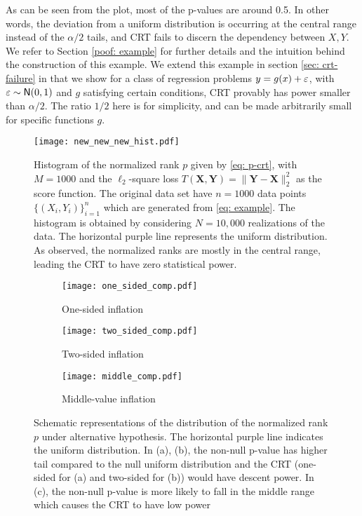 \documentclass[11pt]{article}
\def\bX{\mathbf{X}}
\def\bY{\mathbf{Y}}
\def\normal{\mathsf{N}}
\begin{document}
As can be seen from the plot, most of the p-values are around 0.5. In other words, the deviation from a uniform distribution is occurring at the central range instead of the $\alpha/2$ tails, and CRT fails to discern the dependency between $X,Y$. We refer to Section \ref{poof: example} for further details and the intuition behind the construction of this example. We extend this example in section \ref{sec: crt-failure} in that we show for a class of regression problems $y=g(x)+{\varepsilon}$, with $\eps\sim\normal(0,1)$ and $g$ satisfying certain conditions, CRT provably has power smaller than $\alpha/2$. The  ratio $1/2$ here is for simplicity, and can be made arbitrarily small for specific functions $g$.



\begin{figure}[]
\centering
\texttt{[image: new\_new\_new\_hist.pdf]}
\caption{  Histogram of the normalized rank $p$ given by \eqref{eq: p-crt}, with $M=1000$ and the $\ell_2$-square loss $T(\bX,\bY)=\|\bY-\bX\|^2_2$ as the score function. The original data set have $n=1000$ data points $\{(X_i,Y_i)\}_{i=1}^n$ which are generated from \eqref{eq: example}. The histogram is obtained by considering $N = 10,000$ realizations of the data. The horizontal purple line represents the uniform distribution. As observed, the normalized ranks are mostly in the central range, leading the CRT to have zero statistical power. }\label{fig: hist-crt}
\end{figure}


\begin{figure*}
	\begin{subfigure}[b]{0.32\textwidth}
		\texttt{[image: one\_sided\_comp.pdf]}
		\caption{One-sided inflation}
		\label{fig:one_sided}
	\end{subfigure}%
	\begin{subfigure}[b]{0.32\textwidth}
		\texttt{[image: two\_sided\_comp.pdf]}
		\caption{Two-sided inflation}
		\label{fig:two_sided}
	\end{subfigure}%
	\begin{subfigure}[b]{0.32\textwidth}
		\texttt{[image: middle\_comp.pdf]}
		\caption{Middle-value inflation}
		\label{fig:middle}
	\end{subfigure}
	\caption{Schematic representations of the distribution of the normalized rank $p$ under alternative hypothesis. The horizontal purple line indicates the uniform distribution. In (a), (b), the non-null p-value has higher tail compared to the null uniform distribution and the CRT (one-sided for (a) and two-sided for (b)) would have descent power. In (c), the non-null p-value is more likely to fall in the middle range which causes the CRT to have low power}
	\label{fig:schemtatic}
\end{figure*}
\end{document}
